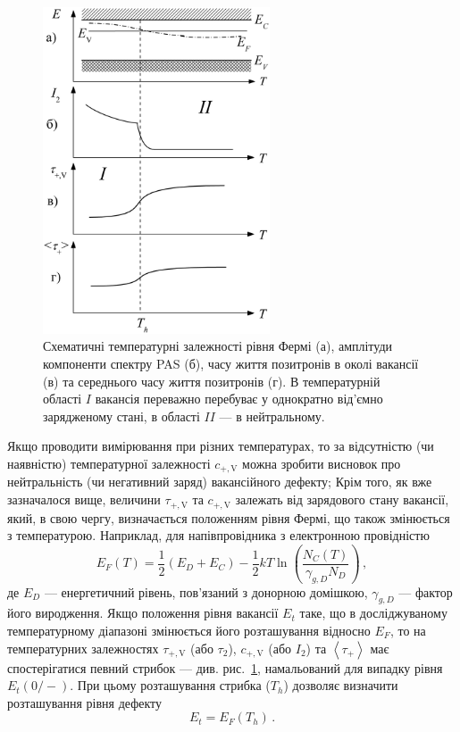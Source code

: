 \documentclass[10pt,a5paper,titlepage,oneside]{book}
\numberwithin{equation}{part}
\begin{document}
\begin{figure}[!b]
\center
\vspace{-5mm}
\includegraphics[width=0.6\textwidth]{Fig3_2}
\vspace{-3mm}
\caption{Схематичні температурні
залежності рівня Фермі (а),
амплітуди компоненти спектру PAS (б),
часу життя позитронів в околі вакансії (в)
та середнього часу життя позитронів (г).
В температурній області $I$ вакансія переважно
перебуває у однократно від'ємно зарядженому стані,
в області $II$ --- в нейтральному.
}
\vspace{-3mm}
\label{F32}
\end{figure}

Якщо проводити вимірювання при різних температурах, то
за відсутністю (чи наявністю) температурної залежності $c_{+,\mathrm{V}}$ можна зробити
висновок про нейтральність (чи негативний заряд) вакансійного дефекту;
Крім того, як вже зазначалося вище, величини $\tau_{+,\mathrm{V}}$ та $c_{+,\mathrm{V}}$ залежать від зарядового стану
вакансії, який, в свою чергу, визначається положенням рівня Фермі, що також змінюється з температурою.
Наприклад, для напівпровідника з електронною провідністю
\begin{equation}\label{EF}
E_F(T)=\frac{1}{2}(E_D+E_C)-\frac{1}{2}kT\ln\left(\frac{N_C(T)}{\gamma_{g,D}N_D}\right)\,,
\end{equation}
де
$E_D$ --- енергетичний рівень, пов'язаний з донорною домішкою,
$\gamma_{g,D}$ --- фактор його виродження.
Якщо положення рівня вакансії $E_{t}$ таке, що
в досліджуваному температурному діапазоні змінюється його розташування
відносно $E_F$, то на температурних залежностях $\tau_{+,\mathrm{V}}$ (або $\tau_2$),
$c_{+,\mathrm{V}}$ (або $I_2$) та $\left\langle\tau_+\right\rangle$
має спостерігатися певний стрибок --- див. рис.~\ref{F32}, намальований для випадку рівня  $E_t(0/-)$.
При цьому розташування стрибка ($T_{h}$) дозволяє визначити розташування рівня дефекту
\begin{equation}
E_t =E_F(T_{h})\,.
\end{equation}
\end{document}
